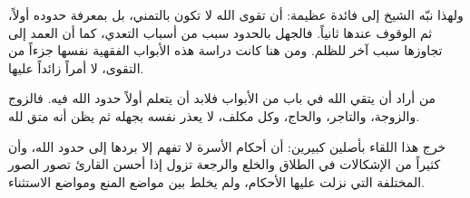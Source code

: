 ولهذا نبّه الشيخ إلى فائدة عظيمة: أن تقوى الله لا تكون بالتمني، بل بمعرفة حدوده أولاً، ثم الوقوف عندها ثانياً. فالجهل بالحدود سبب من أسباب التعدي، كما أن العمد إلى تجاوزها سبب آخر للظلم. ومن هنا كانت دراسة هذه الأبواب الفقهية نفسها جزءاً من التقوى، لا أمراً زائداً عليها.

\begin{fawaid}
من أراد أن يتقي الله في باب من الأبواب فلابد أن يتعلم أولاً حدود الله فيه. فالزوج والزوجة، والتاجر، والحاج، وكل مكلف، لا يعذر نفسه بجهله ثم يظن أنه متق لله.
\end{fawaid}

\separator

خرج هذا اللقاء بأصلين كبيرين: أن أحكام الأسرة لا تفهم إلا بردها إلى حدود الله، وأن كثيراً من الإشكالات في الطلاق والخلع والرجعة تزول إذا أحسن القارئ تصور الصور المختلفة التي نزلت عليها الأحكام، ولم يخلط بين مواضع المنع ومواضع الاستثناء.
